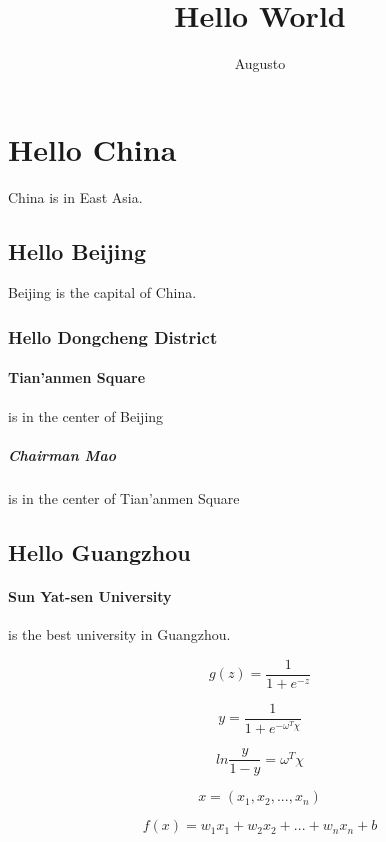 \documentclass{article}
\title{Hello World}
\author {Augusto}
\begin{document}
   \maketitle
   \section{Hello China} China is in East Asia.
     \subsection{Hello Beijing} Beijing is the capital of China.
       \subsubsection{Hello Dongcheng District}
         \paragraph{Tian'anmen Square}is in the center of Beijing
           \subparagraph{Chairman Mao} is in the center of Tian'anmen Square
       \subsection{Hello Guangzhou}
         \paragraph{Sun Yat-sen University} is the best university in Guangzhou.

         \begin{equation}\label{logfunc}
           g(z) = \frac{1}{1 + e ^ {-z}}
         \end{equation}



         \begin{equation}\label{fx}
           y = \frac{1}{1 + e^{-\omega^{T}\chi}}
         \end{equation}

         \begin{equation}\label{prob}
           ln\frac{y}{1-y} = \omega^{T}\chi
         \end{equation}


         \begin{equation}\label{031}
            x = (x_{1}, x_{2}, ... , x_{n})
         \end{equation}

         \begin{equation}\label{032}
            f(x) = w_{1}x_{1} + w_{2}x_{2} + ... + w_{n}x_{n} + b
         \end{equation}
\end{document}
